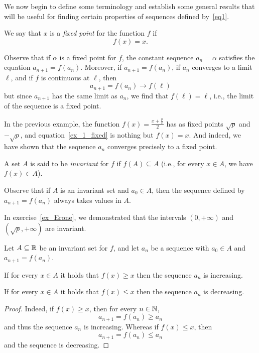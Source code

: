 We now begin to define some terminology and establish some
general results that will be useful for finding certain properties
of sequences defined by~\eqref{eq1}.

\begin{definition}
\mymark{**}%
  We say that $x$ is a \emph{fixed point}%
  for the function $f$ if
  \[
    f(x) = x.
  \]
\end{definition}
Observe that if $\alpha$ is a fixed point for $f$, the constant sequence
$a_n=\alpha$ satisfies the equation $a_{n+1} = f(a_n)$. Moreover, if
$a_{n+1} = f(a_n)$, if $a_n$ converges to a limit $\ell$, and if
$f$ is continuous at $\ell$, then
\[
a_{n+1} = f(a_n) \to f(\ell)
\]
but since $a_{n+1}$ has the same limit as $a_n$, we find that
$f(\ell)=\ell$, i.e., the limit of the sequence is a fixed point.

In the previous example, the function $f(x) = \frac{x+\frac p x}2$ has as fixed
points $\sqrt{p}$ and $-\sqrt{p}$, and equation~\eqref{ex_1_fixed} is
nothing but $f(x)=x$. And indeed, we have shown that the sequence
$a_n$ converges precisely to a fixed point.

\begin{definition}
\mymark{**}%
  A set $A$ is said to be \emph{invariant}
%
  for $f$ if
  $f(A)\subseteq A$
  (i.e., for every $x\in A$, we have $f(x)\in A$).
\end{definition}

Observe that if $A$ is an invariant set and $a_0\in A$, then the
sequence defined by $a_{n+1}=f(a_n)$ always takes values in $A$.

In exercise~\ref{ex_Erone}, we demonstrated that the intervals
$(0,+\infty)$ and $(\sqrt{p},+\infty)$ are invariant.

\begin{theorem}\label{th_1}
\mymark{*}%
  Let $A\subseteq {\mathbb R}$ be an invariant set for $f$, and let $a_n$ be a
  sequence with $a_0 \in A$ and $a_{n+1}=f(a_n)$.

  If for every $x\in A$
  it holds that $f(x) \ge x$
  then the sequence $a_n$ is increasing.

  If for every $x\in A$ it holds that $f(x) \le x$
  then the sequence $a_n$ is decreasing.
\end{theorem}
\begin{proof}
\mymark{*}%
  Indeed, if $f(x) \ge x$, then for every $n\in {\mathbb N}$,
  \[
  a_{n+1} = f(a_n) \ge a_n
  \]
and thus the sequence $a_n$ is increasing. Whereas if $f(x) \le x$, then
  \[
  a_{n+1} = f(a_n) \le a_n
  \]
and the sequence is decreasing.
\end{proof}

